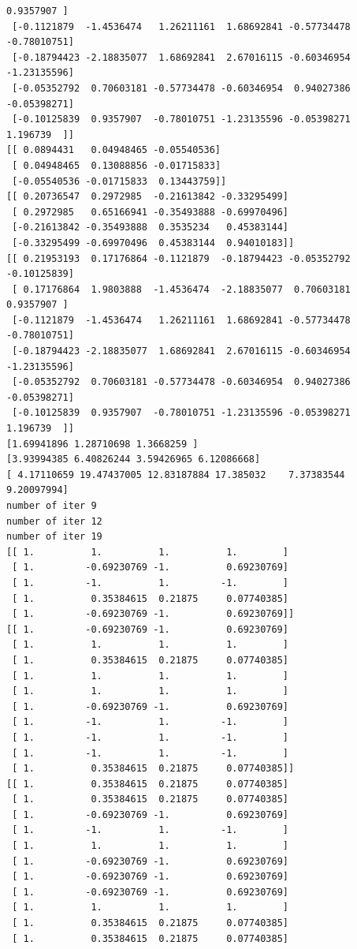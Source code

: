 \documentclass[a4paper,11pt,final]{article}
\begin{document}
\begin{Verbatim}[commandchars=\\\{\},frame=leftline,fontsize=\small, xleftmargin=0.5em]
0.9357907 ]
 [-0.1121879  -1.4536474   1.26211161  1.68692841 -0.57734478
-0.78010751]
 [-0.18794423 -2.18835077  1.68692841  2.67016115 -0.60346954
-1.23135596]
 [-0.05352792  0.70603181 -0.57734478 -0.60346954  0.94027386
-0.05398271]
 [-0.10125839  0.9357907  -0.78010751 -1.23135596 -0.05398271
1.196739  ]]
[[ 0.0894431   0.04948465 -0.05540536]
 [ 0.04948465  0.13088856 -0.01715833]
 [-0.05540536 -0.01715833  0.13443759]]
[[ 0.20736547  0.2972985  -0.21613842 -0.33295499]
 [ 0.2972985   0.65166941 -0.35493888 -0.69970496]
 [-0.21613842 -0.35493888  0.3535234   0.45383144]
 [-0.33295499 -0.69970496  0.45383144  0.94010183]]
[[ 0.21953193  0.17176864 -0.1121879  -0.18794423 -0.05352792
-0.10125839]
 [ 0.17176864  1.9803888  -1.4536474  -2.18835077  0.70603181
0.9357907 ]
 [-0.1121879  -1.4536474   1.26211161  1.68692841 -0.57734478
-0.78010751]
 [-0.18794423 -2.18835077  1.68692841  2.67016115 -0.60346954
-1.23135596]
 [-0.05352792  0.70603181 -0.57734478 -0.60346954  0.94027386
-0.05398271]
 [-0.10125839  0.9357907  -0.78010751 -1.23135596 -0.05398271
1.196739  ]]
[1.69941896 1.28710698 1.3668259 ]
[3.93994385 6.40826244 3.59426965 6.12086668]
[ 4.17110659 19.47437005 12.83187884 17.385032    7.37383544
9.20097994]
number of iter 9
number of iter 12
number of iter 19
[[ 1.          1.          1.          1.        ]
 [ 1.         -0.69230769 -1.          0.69230769]
 [ 1.         -1.          1.         -1.        ]
 [ 1.          0.35384615  0.21875     0.07740385]
 [ 1.         -0.69230769 -1.          0.69230769]]
[[ 1.         -0.69230769 -1.          0.69230769]
 [ 1.          1.          1.          1.        ]
 [ 1.          0.35384615  0.21875     0.07740385]
 [ 1.          1.          1.          1.        ]
 [ 1.          1.          1.          1.        ]
 [ 1.         -0.69230769 -1.          0.69230769]
 [ 1.         -1.          1.         -1.        ]
 [ 1.         -1.          1.         -1.        ]
 [ 1.         -1.          1.         -1.        ]
 [ 1.          0.35384615  0.21875     0.07740385]]
[[ 1.          0.35384615  0.21875     0.07740385]
 [ 1.          0.35384615  0.21875     0.07740385]
 [ 1.         -0.69230769 -1.          0.69230769]
 [ 1.         -1.          1.         -1.        ]
 [ 1.          1.          1.          1.        ]
 [ 1.         -0.69230769 -1.          0.69230769]
 [ 1.         -0.69230769 -1.          0.69230769]
 [ 1.         -0.69230769 -1.          0.69230769]
 [ 1.          1.          1.          1.        ]
 [ 1.          0.35384615  0.21875     0.07740385]
 [ 1.          0.35384615  0.21875     0.07740385]

\end{Verbatim}
\end{document}
